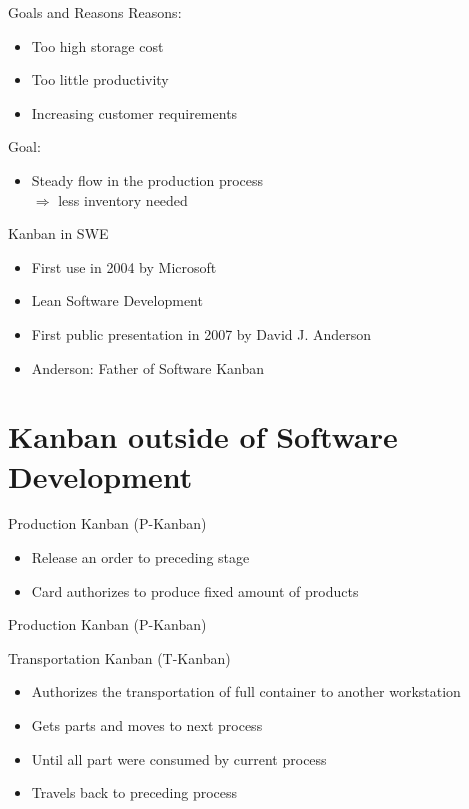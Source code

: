 \documentclass[12pt]{beamer}
\newcommand{\bi}{\begin{itemize}}
\newcommand{\ei}{\end{itemize}}
\begin{document}
		\begin{frame}{\secname}{Goals and Reasons}
			Reasons:
			\bi
				\item Too high storage cost
				\item Too little productivity
				\item Increasing customer requirements
			\ei
			
			\vspace{0.5cm}
			\pause
			
			Goal:
			\bi
				\item Steady flow in the production process \\ $\Rightarrow$ less inventory needed
			\ei
		\end{frame}
		
		\begin{frame}{\secname}{Kanban in SWE}
			\bi
				\item First use in 2004 by Microsoft
				\item Lean Software Development
				\item First public presentation in 2007 by David J. Anderson
				\item Anderson: Father of Software Kanban
			\ei
		\end{frame}
		
	\section{Kanban outside of Software Development}
	
		\begin{frame}{\secname}{Production Kanban (P-Kanban)}
			\bi
				\item Release an order to preceding stage
				\item Card authorizes to produce fixed amount of products
			\ei
		\end{frame}
		
		\begin{frame}{\secname}{Production Kanban (P-Kanban)}
		\end{frame}
		
		\begin{frame}{\secname}{Transportation Kanban (T-Kanban)}
			\bi
				\item Authorizes the transportation of full container to another workstation
				\item Gets parts and moves to next process
				\item Until all part were consumed by current process
				\item Travels back to preceding process
			\ei
		\end{frame}
		
\end{document}
